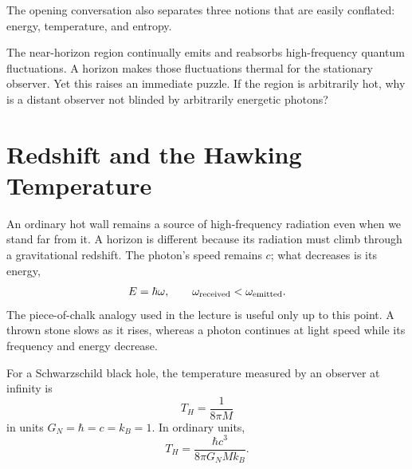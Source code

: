 The opening conversation also separates three notions that are easily conflated: energy, temperature, and entropy.

\begin{classroomqa}
\end{classroomqa}


The near-horizon region continually emits and reabsorbs high-frequency quantum fluctuations. A horizon makes those fluctuations thermal for the stationary observer. Yet this raises an immediate puzzle. If the region is arbitrarily hot, why is a distant observer not blinded by arbitrarily energetic photons?

\section{Redshift and the Hawking Temperature}

An ordinary hot wall remains a source of high-frequency radiation even when we stand far from it. A horizon is different because its radiation must climb through a gravitational redshift. The photon's speed remains \(c\); what decreases is its energy,
\begin{equation}
E=\hbar\omega,
\qquad
\omega_{\rm received}<\omega_{\rm emitted}.
\end{equation}
The piece-of-chalk analogy used in the lecture is useful only up to this point. A thrown stone slows as it rises, whereas a photon continues at light speed while its frequency and energy decrease.

For a Schwarzschild black hole, the temperature measured by an observer at infinity is
\begin{equation}
T_H=\frac{1}{8\pi M}
\label{eq:l09-hawking-natural}
\end{equation}
in units \(G_N=\hbar=c=k_B=1\). In ordinary units,
\begin{equation}
T_H=\frac{\hbar c^3}{8\pi G_N M k_B}.
\label{eq:l09-hawking-full}
\end{equation}

